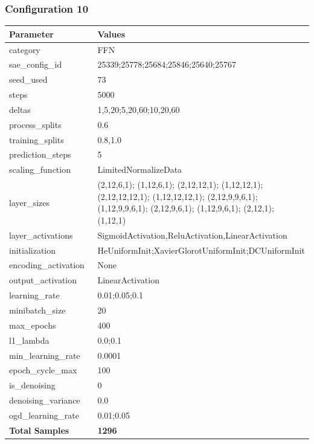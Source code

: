 \documentclass[a4paper,11pt,oneside]{article}
\theoremstyle{plain}
\theoremstyle{definition}
\begin{document}
	\newpage
	\subsubsection{Configuration 10}\label{config10}
	\begin{longtable}[H]{|p{0.3\linewidth}|p{0.7\linewidth}|} \hline \textbf{Parameter} &\textbf{Values} \\\hline{category} & {FFN} \\\hline
		{sae\_config\_id} & {25339;25778;25684;25846;25640;25767} \\\hline
		{seed\_used} & {73} \\\hline
		{steps} & {5000} \\\hline
		{deltas} & {1,5,20;5,20,60;10,20,60} \\\hline
		{process\_splits} & {0.6} \\\hline
		{training\_splits} & {0.8,1.0} \\\hline
		{prediction\_steps} & {5} \\\hline
		{scaling\_function} & {LimitedNormalizeData} \\\hline
		{layer\_sizes} & {(2,12,6,1); (1,12,6,1); (2,12,12,1); (1,12,12,1); (2,12,12,12,1); (1,12,12,12,1); (2,12,9,9,6,1); (1,12,9,9,6,1); (2,12,9,6,1); (1,12,9,6,1); (2,12,1); (1,12,1)} \\\hline
		{layer\_activations} & {SigmoidActivation,ReluActivation,LinearActivation} \\\hline
		{initialization} & {HeUniformInit;XavierGlorotUniformInit;DCUniformInit} \\\hline
		{encoding\_activation} & {None} \\\hline
		{output\_activation} & {LinearActivation} \\\hline
		{learning\_rate} & {0.01;0.05;0.1} \\\hline
		{minibatch\_size} & {20} \\\hline
		{max\_epochs} & {400} \\\hline
		{l1\_lambda} & {0.0;0.1} \\\hline
		{min\_learning\_rate} & {0.0001} \\\hline
		{epoch\_cycle\_max} & {100} \\\hline
		{is\_denoising} & {0} \\\hline
		{denoising\_variance} & {0.0} \\\hline
		{ogd\_learning\_rate} & {0.01;0.05} \\\hline
		{\textbf{Total Samples}} & {\textbf{1296}} \\\hline
	\end{longtable}
	
\end{document}
